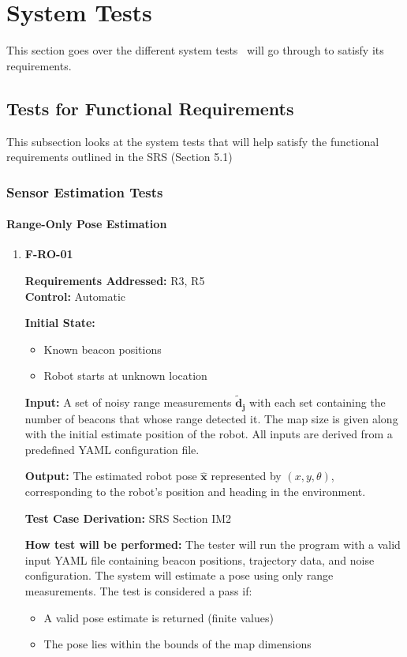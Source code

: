 \documentclass[12pt, titlepage]{article}
\begin{document}
\section{System Tests}\label{sec_sys-tests}

This section goes over the different system tests \progname~will go through to satisfy its requirements.

\subsection{Tests for Functional Requirements}

This subsection looks at the system tests that will help satisfy the functional requirements outlined in the SRS (Section 5.1)

\subsubsection{Sensor Estimation Tests}
		
\paragraph{Range-Only Pose Estimation}

\begin{enumerate}

\item{\textbf{F-RO-01}}

\textbf{Requirements Addressed:} R3, R5\\
\textbf{Control:} Automatic
					
\textbf{Initial State: }
\begin{itemize}
  \item Known beacon positions
  \item Robot starts at unknown location
\end{itemize}
					
\textbf{Input:} A set of noisy range measurements $\mathbf{\tilde{d}_j}$ with each set containing the number of beacons that whose range detected it. The map size is given along with the initial estimate position of the robot. All inputs are derived from a predefined YAML configuration file.

\textbf{Output:} The estimated robot pose $\mathbf{\hat{x}}$ represented by $(x,y,\theta)$, corresponding to the robot's position and heading in the environment.
 

\textbf{Test Case Derivation:} SRS Section IM2
					
\textbf{How test will be performed:} The tester will run the program with a valid input YAML file containing beacon positions, trajectory data, and noise configuration. The system will estimate a pose using only range measurements. The test is considered a pass if:
\begin{itemize}
  \item A valid pose estimate is returned (finite values)
  \item The pose lies within the bounds of the map dimensions
\end{itemize}

\end{enumerate}
\end{document}
